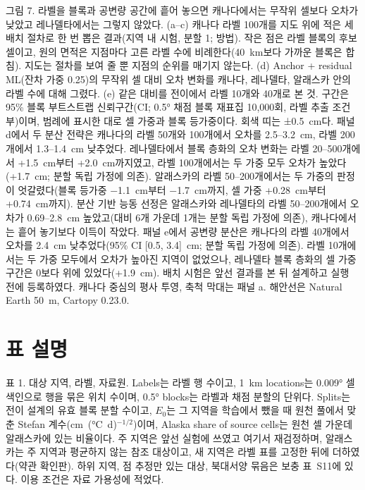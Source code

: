 \noindent 그림 7. 라벨을 블록과 공변량 공간에 흩어 놓으면 캐나다에서는 무작위 셀보다 오차가 낮았고 레나델타에서는 그렇지 않았다.
(a--c) 캐나다 라벨 100개를 지도 위에 적은 세 배치 절차로 한 번 뽑은 결과(지역 내 시험, 분할 1; 방법). 작은 점은 라벨 블록의 후보 셀이고, 원의 면적은 지점마다 고른 라벨 수에 비례한다(40~km보다 가까운 블록은 합침).
지도는 절차를 보여 줄 뿐 지점의 순위를 매기지 않는다.
(d) Anchor + residual ML(잔차 가중 0.25)의 무작위 셀 대비 오차 변화를 캐나다, 레나델타, 알래스카 안의 라벨 수에 대해 그렸다.
(e) 같은 대비를 전이에서 라벨 10개와 40개로 본 것.
구간은 95\% 블록 부트스트랩 신뢰구간(CI; 0.5° 채점 블록 재표집 10,000회, 라벨 추출 조건부)이며, 범례에 표시한 대로 셀 가중과 블록 등가중이다. 회색 띠는 ±0.5~cm다.
패널 d에서 두 분산 전략은 캐나다의 라벨 50개와 100개에서 오차를 2.5--3.2~cm, 라벨 200개에서 1.3--1.4~cm 낮추었다.
레나델타에서 블록 층화의 오차 변화는 라벨 20--500개에서 +1.5~cm부터 +2.0~cm까지였고, 라벨 100개에서는 두 가중 모두 오차가 높았다(+1.7~cm; 분할 독립 가정에 의존).
알래스카의 라벨 50--200개에서는 두 가중의 판정이 엇갈렸다(블록 등가중 −1.1~cm부터 −1.7~cm까지, 셀 가중 +0.28~cm부터 +0.74~cm까지).
분산 기반 능동 선정은 알래스카와 레나델타의 라벨 50--200개에서 오차가 0.69--2.8~cm 높았고(대비 6개 가운데 1개는 분할 독립 가정에 의존), 캐나다에서는 흩어 놓기보다 이득이 작았다.
패널 e에서 공변량 분산은 캐나다의 라벨 40개에서 오차를 2.4~cm 낮추었다(95\% CI [0.5, 3.4]~cm; 분할 독립 가정에 의존). 라벨 10개에서는 두 가중 모두에서 오차가 높아진 지역이 없었으나, 레나델타 블록 층화의 셀 가중 구간은 0보다 위에 있었다(+1.9~cm).
배치 시험은 앞선 결과를 본 뒤 설계하고 실행 전에 등록하였다.
캐나다 중심의 평사 투영, 축척 막대는 패널 a. 해안선은 Natural Earth 50~m, Cartopy 0.23.0.

\medskip

\section*{표 설명}

\noindent 표 1. 대상 지역, 라벨, 자료원.
Labels는 라벨 행 수이고, 1~km locations는 0.009° 셀 색인으로 행을 묶은 위치 수이며, 0.5° blocks는 라벨과 채점 분할의 단위다. Splits는 전이 설계의 유효 블록 분할 수이고, $E_0$는 그 지역을 학습에서 뺐을 때 원천 풀에서 맞춘 Stefan 계수(cm~(°C~d)$^{-1/2}$)이며, Alaska share of source cells는 원천 셀 가운데 알래스카에 있는 비율이다.
주 지역은 앞선 실험에 쓰였고 여기서 재검정하며, 알래스카는 주 지역과 평균하지 않는 참조 대상이고, 새 지역은 라벨 표를 고정한 뒤에 더하였다(약관 확인판).
하위 지역, 점 추정만 있는 대상, 북대서양 묶음은 보충 표~S11에 있다.
이용 조건은 자료 가용성에 적었다.
